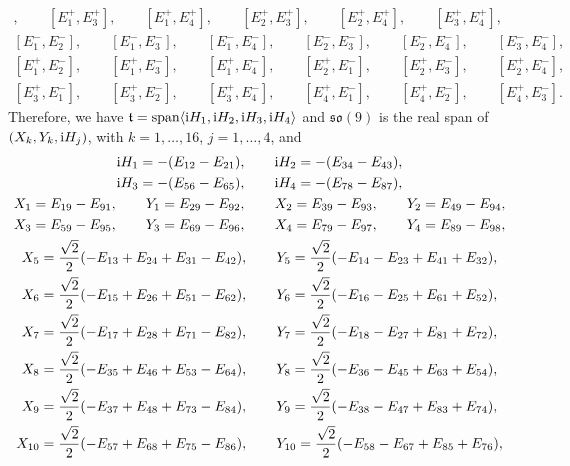 \documentclass[pdftex]{sigma}
\numberwithin{equation}{section}
\begin{document}
\begin{Example}
\begin{gather*}
[E_1^+, E_2^+], \qquad [E_1^+, E_3^+], \qquad [E_1^+, E_4^+], \qquad [E_2^+, E_3^+], \qquad [E_2^+, E_4^+], \qquad [E_3^+, E_4^+],\\
[E_1^-, E_2^-], \qquad [E_1^-, E_3^-], \qquad [E_1^-, E_4^-], \qquad [E_2^-, E_3^-], \qquad [E_2^-, E_4^-], \qquad [E_3^-, E_4^-],\\
[E_1^+, E_2^-], \qquad [E_1^+, E_3^-], \qquad [E_1^+, E_4^-], \qquad [E_2^+, E_1^-], \qquad [E_2^+, E_3^-], \qquad [E_2^+, E_4^-], \\
 [E_3^+, E_1^-], \qquad [E_3^+, E_2^-], \qquad [E_3^+, E_4^-], \qquad [E_4^+, E_1^-], \qquad [E_4^+, E_2^-], \qquad [E_4^+, E_3^-].
\end{gather*}
Therefore, we have
$\mathfrak t = \operatorname{span}\langle {\rm i}H_1, {\rm i}H_2, {\rm i}H_3, {\rm i}H_4\rangle$ and ${\mathfrak{so}}(9)$ is the real span of $(X_k, Y_k, {\rm i}H_j)$, with $k = 1, \dots, 16$, $j = 1, \dots, 4$,
and
\begin{gather*}
 {\rm i}H_1 = - (E_{12} - E_{21}), \qquad {\rm i}H_2 = -(E_{34} - E_{43}),\\
 {\rm i}H_3 = - (E_{56} - E_{65}), \qquad {\rm i}H_4 =- (E_{78} - E_{87}),\\
 X_1 = E_{19} - E_{91}, \qquad Y_1 = E_{29} - E_{92}, \qquad X_2 = E_{39} - E_{93}, \qquad Y_2 = E_{49} - E_{94},\\
 X_3 = E_{59} - E_{95}, \qquad Y_3 = E_{69} - E_{96}, \qquad X_4 = E_{79} - E_{97}, \qquad Y_4 = E_{89} - E_{98},\\
 X_5 = \frac{\sqrt{2}}{2} (-E_{13} + E_{24} + E_{31} - E_{42}), \qquad Y_5 = \frac{\sqrt{2}}{2} (-E_{14} - E_{23} + E_{41} + E_{32}),\\
 X_6 = \frac{\sqrt{2}}{2} (-E_{15} + E_{26} + E_{51} - E_{62}), \qquad Y_6 = \frac{\sqrt{2}}{2} (-E_{16} - E_{25} + E_{61} + E_{52}),\\
 X_7 = \frac{\sqrt{2}}{2} (-E_{17} + E_{28} + E_{71} - E_{82}), \qquad Y_7 = \frac{\sqrt{2}}{2} (-E_{18} - E_{27} + E_{81} + E_{72}),\\
 X_8 = \frac{\sqrt{2}}{2} (-E_{35} + E_{46} + E_{53} - E_{64}), \qquad Y_8 = \frac{\sqrt{2}}{2} (-E_{36} - E_{45} + E_{63} + E_{54}),\\
 X_9 = \frac{\sqrt{2}}{2} (-E_{37} + E_{48} + E_{73} - E_{84}), \qquad Y_9 = \frac{\sqrt{2}}{2} (-E_{38} - E_{47} + E_{83} + E_{74}),\\
 X_{10} = \frac{\sqrt{2}}{2} (-E_{57} + E_{68} + E_{75} - E_{86}), \qquad Y_{10} = \frac{\sqrt{2}}{2} (-E_{58} - E_{67} + E_{85} + E_{76}),\\

\end{gather*}
\end{Example}
\end{document}
